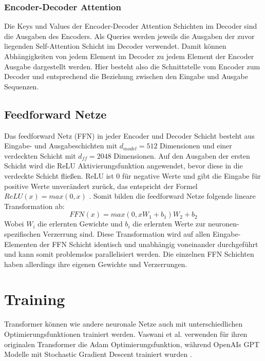 \documentclass[conference]{IEEEtran}
\begin{document}
\subsubsection{Encoder-Decoder Attention}
Die Keys und Values der Encoder-Decoder Attention Schichten im Decoder sind die Ausgaben des Encoders. Als Queries werden jeweils die Ausgaben der zuvor liegenden Self-Attention Schicht im Decoder verwendet. Damit können Abhängigkeiten von jedem Element im Decoder zu jedem Element der Encoder Ausgabe dargestellt werden. Hier besteht also die Schnittstelle vom Encoder zum Decoder und entsprechend die Beziehung zwischen den Eingabe und Ausgabe Sequenzen.

\subsection{Feedforward Netze}
Das feedforward Netz (FFN) in jeder Encoder und Decoder Schicht besteht aus Eingabe- und Ausgabeschichten mit $d_{model} = 512$ Dimensionen und einer verdeckten Schicht mit $d_{ff} = 2048$ Dimensionen. Auf den Ausgaben der ersten Schicht wird die ReLU Aktivierungsfunktion angewendet, bevor diese in die verdeckte Schicht fließen. ReLU ist $0$ für negative Werte und gibt die Eingabe für positive Werte unverändert zurück, das entspricht der Formel $ReLU(x) = max(0, x)$ \cite{activation_functions}. Somit bilden die feedforward Netze folgende lineare Transformation ab:
\begin{equation} \label{eq:ffn}
    FFN(x) = max(0,xW_1 + b_1)W_2 + b_2
\end{equation}
Wobei $W_i$ die erlernten Gewichte und $b_i$ die erlernten Werte zur neuronen-spezifischen Verzerrung sind. Diese Transformation wird auf allen Eingabe-Elementen der FFN Schicht identisch und unabhängig voneinander durchgeführt und kann somit problemslos parallelisiert werden. Die einzelnen FFN Schichten haben allerdings ihre eigenen Gewichte und Verzerrungen. \cite{attention_is_all_you_need}


\section{Training}
Transformer können wie andere neuronale Netze auch mit unterschiedlichen Optimierungsfunktionen trainiert werden. Vaswani et al. \cite{attention_is_all_you_need} verwenden für ihren originalen Transformer die Adam Optimierungsfunktion, während OpenAIs GPT Modelle mit Stochastic Gradient Descent trainiert wurden \cite{gpt_1}.
\end{document}
